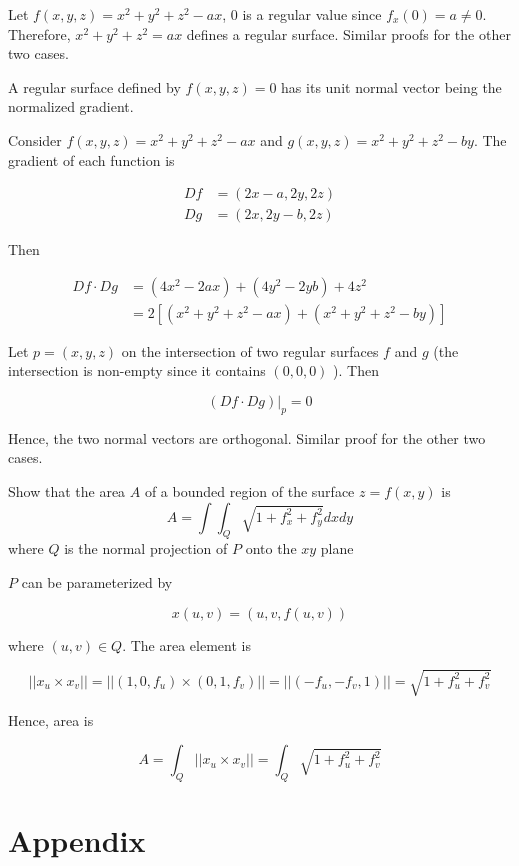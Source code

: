 \documentclass{article}
\begin{document}
Let $f(x, y, z) = x^2 + y^2 + z^2 - ax$, $0$ is a regular value since $f_x(0) = a \neq 0$. Therefore, $x^2 + y^2 + z^2 = ax$ defines a regular surface. Similar proofs for the other two cases.

\begin{lemma}
    \label{lemma:gradient}
    A regular surface defined by $f(x, y, z) = 0$ has its unit normal vector being the normalized gradient.
\end{lemma}

Consider $f(x, y, z) = x^2 + y^2 + z^2 - ax$ and $g(x, y, z) = x^2 + y^2 + z^2 - by$. The gradient of each function is

\begin{align*}
    Df &= (2x - a, 2y , 2z) \\
    Dg &= (2x, 2y - b, 2z)
\end{align*}

Then 

\begin{align*}
    Df \cdot Dg
    &= (4x^2 - 2ax) + (4y^2 - 2yb) + 4z^2 \\
    &= 2 [(x^2 + y^2 + z^2 - ax) + (x^2 + y^2 + z^2 - by)]
\end{align*}

Let $p = (x, y, z)$ on the intersection of two regular surfaces $f$ and $g$ (the intersection is non-empty since it contains $(0, 0, 0)$ ). Then

\[
    (Df \cdot Dg) |_p = 0
\]

Hence, the two normal vectors are orthogonal. Similar proof for the other two cases.

\begin{problem}
    Show that the area $A$ of a bounded region of the surface $z = f(x, y)$ is
    \[
        A = \int\int_{Q} \sqrt{1 + f_x^2 + f_y^2} dxdy
    \]
    where $Q$ is the normal projection of $P$ onto the $xy$ plane
\end{problem}

$P$ can be parameterized by 

\[
    x(u, v) = (u, v, f(u, v))
\]

where $(u, v) \in Q$. The area element is

\[
    ||x_u \times x_v|| = ||(1, 0, f_u) \times (0, 1, f_v)|| = ||(-f_u, -f_v, 1)|| = \sqrt{1 + f_u^2 + f_v^2}
\]

Hence, area is

\[
    A = \int_Q ||x_u \times x_v|| = \int_Q \sqrt{1 + f_u^2 + f_v^2}
\]

\section{Appendix}
\end{document}

